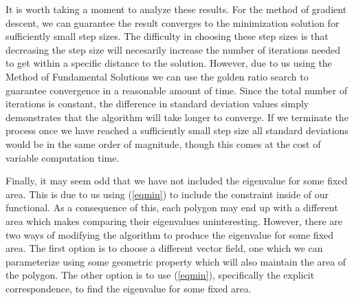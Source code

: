 It is worth taking a moment to analyze these results.
For the method of gradient descent, we can guarantee the result converges to the minimization solution for sufficiently small step sizes\cite{curry}.
The difficulty in choosing these step sizes is that decreasing the step size will necesarily increase the number of iterations needed to get within a specific distance to the solution.
However, due to us using the Method of Fundamental Solutions we can use the golden ratio search to guarantee convergence in a reasonable amount of time.
Since the total number of iterations is constant, the difference in standard deviation values simply demonstrates that the algorithm will take longer to converge. 
If we terminate the process once we have reached a sufficiently small step size all standard deviations would be in the same order of magnitude, though this comes at the cost of variable computation time. 

Finally, it may seem odd that we have not included the eigenvalue for some fixed area.
This is due to us using (\ref{eqmin}) to include the constraint inside of our functional.
As a consequence of this, each polygon may end up with a different area which makes comparing their eigenvalues uninteresting.
However, there are two ways of modifying the algorithm to produce the eigenvalue for some fixed area.
The first option is to choose a different vector field, one which we can parameterize using some geometric property which will also maintain the area of the polygon.
The other option is to use (\ref{eqmin}), specifically the explicit correspondence, to find the eigenvalue for some fixed area.



